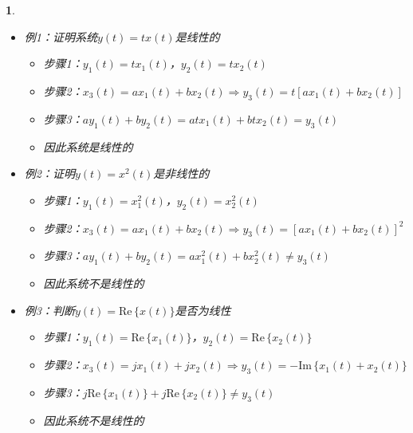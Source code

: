 \documentclass[UTF8]{report}
\def\Im{\mathrm{Im\,}}
\def\Re{\mathrm{Re\,}}
\theoremstyle{MyLineTheoremStyle} %
\theoremstyle{MyBlockTheoremStyle} %
\theoremstyle{MySubsubsectionStyle} %
\newtheorem{definition}{}
\begin{document}
\begin{definition}
\begin{itemize}
        叠加性：如果系统对信号$x_k(t)$的响应为$y_k(t)$，$k=1,2,3,\ldots$，那么系统对信号$x(t) = \sum_{k} x_k(t)$的响应$y(t)$为
        \[
        y(t) = \sum_{k} y_k(t)
        \]
        离散时间线性系统同上

        判断一个系统“$\rightarrow$”是否线性系统的一般性步骤（$a, b, x(t), y(t)$可为复数）：
        \begin{enumerate}
            \item $x_1(t) \rightarrow y_1(t)$，$x_2(t) \rightarrow y_2(t)$
            \item 设$x_3(t) = a x_1(t) + b x_2(t) \rightarrow y_3(t)$
            \item 如果$y_3(t) = a y_1(t) + b y_2(t)$，则系统为线性的
        \end{enumerate}
        本质利用“线性”的定义

        \item 例1：证明系统$y(t) = t x(t)$是线性的
        \begin{itemize}
            \item 步骤1：$y_1(t) = t x_1(t)$，$y_2(t) = t x_2(t)$
            \item 步骤2：$x_3(t) = a x_1(t) + b x_2(t) \Rightarrow y_3(t) = t [a x_1(t) + b x_2(t)]$
            \item 步骤3：$a y_1(t) + b y_2(t) = a t x_1(t) + b t x_2(t) = y_3(t)$
            \item 因此系统是线性的
        \end{itemize}

        \item 例2：证明$y(t) = x^2(t)$是非线性的
        \begin{itemize}
            \item 步骤1：$y_1(t) = x_1^2(t)$，$y_2(t) = x_2^2(t)$
            \item 步骤2：$x_3(t) = a x_1(t) + b x_2(t) \Rightarrow y_3(t) = [a x_1(t) + b x_2(t)]^2$
            \item 步骤3：$a y_1(t) + b y_2(t) = a x_1^2(t) + b x_2^2(t) \neq y_3(t)$
            \item 因此系统不是线性的
        \end{itemize}

        \item 例3：判断$y(t) = \Re\{x(t)\}$是否为线性
        \begin{itemize}
            \item 步骤1：$y_1(t) = \Re\{x_1(t)\}$，$y_2(t) = \Re\{x_2(t)\}$
            \item 步骤2：$x_3(t) = j x_1(t) + j x_2(t) \Rightarrow y_3(t) = -\Im\{x_1(t) + x_2(t)\}$
            \item 步骤3：$j \Re\{x_1(t)\} + j \Re\{x_2(t)\} \neq y_3(t)$
            \item 因此系统不是线性的
        \end{itemize}


\end{itemize}
\end{definition}
\end{document}
